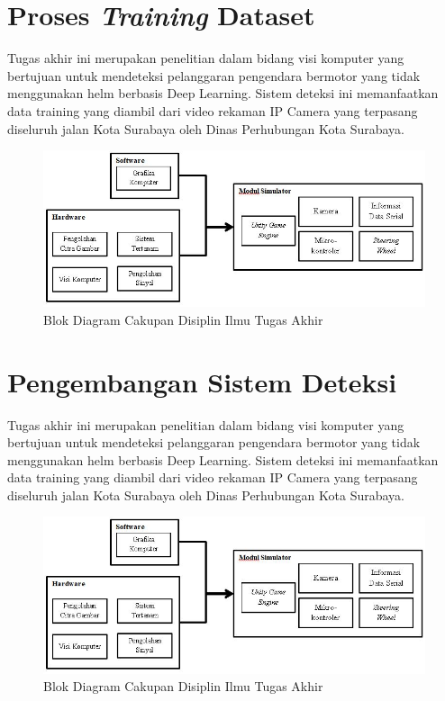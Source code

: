 \section{Proses \textit{Training} Dataset}
\vspace{1ex}

	\par Tugas akhir ini merupakan penelitian dalam bidang visi komputer yang bertujuan untuk mendeteksi pelanggaran pengendara bermotor yang tidak menggunakan helm berbasis Deep Learning. Sistem deteksi ini memanfaatkan data training yang diambil dari video rekaman IP Camera yang terpasang diseluruh jalan Kota Surabaya oleh Dinas Perhubungan Kota Surabaya.
\begin{figure}[H]
	\captionsetup{justification=centering}
	\includegraphics[scale=0.55]{img/cakupanTA.JPG}
	\caption{Blok Diagram Cakupan Disiplin Ilmu Tugas Akhir}
	\label{fig: 3_1}
\end{figure}
\vspace{1ex}

\section{Pengembangan Sistem Deteksi}
\vspace{1ex}

	\par Tugas akhir ini merupakan penelitian dalam bidang visi komputer yang bertujuan untuk mendeteksi pelanggaran pengendara bermotor yang tidak menggunakan helm berbasis Deep Learning. Sistem deteksi ini memanfaatkan data training yang diambil dari video rekaman IP Camera yang terpasang diseluruh jalan Kota Surabaya oleh Dinas Perhubungan Kota Surabaya.
\begin{figure}[H]
	\captionsetup{justification=centering}
	\includegraphics[scale=0.55]{img/cakupanTA.JPG}
	\caption{Blok Diagram Cakupan Disiplin Ilmu Tugas Akhir}
	\label{fig: 3_1}
\end{figure}
\vspace{1ex}

